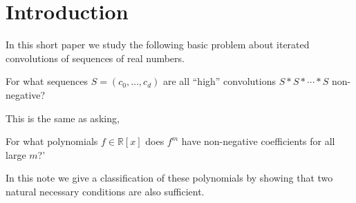 \documentclass{daj}
\newcommand{\R}{\mathbb{R}}
\def\N{\mathbb{N}}
\theoremstyle{definition}
\theoremstyle{remark}
\begin{document}
\begin{frontmatter}[classification=text]


\author[marcus]{Marcus Michelen}
\author[julian]{Julian Sahasrabudhe}

\begin{abstract}
Let $f \in \R[z]$ be a polynomial with real coefficients. We say that $f$ is \emph{eventually non-negative} if $f^m$ has non-negative coefficients 
	for all sufficiently large $m \in \N$. In this short paper, we give a classification of all eventually non-negative polynomials. This generalizes a theorem of De Angelis, and proves a conjecture of Bergweiler, Eremenko and Sokal.
\end{abstract}
\end{frontmatter}

\section{Introduction}

In this short paper we study the following basic problem about iterated convolutions of sequences of real numbers. 
\begin{center}
For what sequences $S  = (c_0,\ldots,c_d)$ are all ``high'' convolutions $S \ast S \ast \cdots \ast S$ non-negative?
\end{center}
This is the same as asking,
\begin{center}
For what polynomials $f \in \R[x]$ does $f^m$ have non-negative coefficients for all large $m$?'
\end{center}
In this note we give a classification of these polynomials by showing that two natural necessary conditions are also sufficient.
\end{document}
